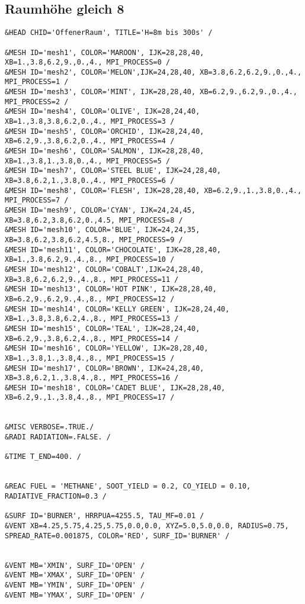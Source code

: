 \subsection*{Raumhöhe gleich 8}
\begin{lstlisting}[emptylines=0,basicstyle=\tiny]
&HEAD CHID='OffenerRaum', TITLE='H=8m bis 300s' /

&MESH ID='mesh1', COLOR='MAROON', IJK=28,28,40, XB=1.,3.8,6.2,9.,0.,4., MPI_PROCESS=0 /
&MESH ID='mesh2', COLOR='MELON',IJK=24,28,40, XB=3.8,6.2,6.2,9.,0.,4., MPI_PROCESS=1 /
&MESH ID='mesh3', COLOR='MINT', IJK=28,28,40, XB=6.2,9.,6.2,9.,0.,4., MPI_PROCESS=2 /
&MESH ID='mesh4', COLOR='OLIVE', IJK=28,24,40, XB=1.,3.8,3.8,6.2,0.,4., MPI_PROCESS=3 /
&MESH ID='mesh5', COLOR='ORCHID', IJK=28,24,40, XB=6.2,9.,3.8,6.2,0.,4., MPI_PROCESS=4 /
&MESH ID='mesh6', COLOR='SALMON', IJK=28,28,40, XB=1.,3.8,1.,3.8,0.,4., MPI_PROCESS=5 /
&MESH ID='mesh7', COLOR='STEEL BLUE', IJK=24,28,40, XB=3.8,6.2,1.,3.8,0.,4., MPI_PROCESS=6 /
&MESH ID='mesh8', COLOR='FLESH', IJK=28,28,40, XB=6.2,9.,1.,3.8,0.,4., MPI_PROCESS=7 /
&MESH ID='mesh9', COLOR='CYAN', IJK=24,24,45, XB=3.8,6.2,3.8,6.2,0.,4.5, MPI_PROCESS=8 /
&MESH ID='mesh10', COLOR='BLUE', IJK=24,24,35, XB=3.8,6.2,3.8,6.2,4.5,8., MPI_PROCESS=9 /
&MESH ID='mesh11', COLOR='CHOCOLATE', IJK=28,28,40, XB=1.,3.8,6.2,9.,4.,8., MPI_PROCESS=10 /
&MESH ID='mesh12', COLOR='COBALT',IJK=24,28,40, XB=3.8,6.2,6.2,9.,4.,8., MPI_PROCESS=11 /
&MESH ID='mesh13', COLOR='HOT PINK', IJK=28,28,40, XB=6.2,9.,6.2,9.,4.,8., MPI_PROCESS=12 /
&MESH ID='mesh14', COLOR='KELLY GREEN', IJK=28,24,40, XB=1.,3.8,3.8,6.2,4.,8., MPI_PROCESS=13 /
&MESH ID='mesh15', COLOR='TEAL', IJK=28,24,40, XB=6.2,9.,3.8,6.2,4.,8., MPI_PROCESS=14 /
&MESH ID='mesh16', COLOR='YELLOW', IJK=28,28,40, XB=1.,3.8,1.,3.8,4.,8., MPI_PROCESS=15 /
&MESH ID='mesh17', COLOR='BROWN', IJK=24,28,40, XB=3.8,6.2,1.,3.8,4.,8., MPI_PROCESS=16 /
&MESH ID='mesh18', COLOR='CADET BLUE', IJK=28,28,40, XB=6.2,9.,1.,3.8,4.,8., MPI_PROCESS=17 /


&MISC VERBOSE=.TRUE./
&RADI RADIATION=.FALSE. /

&TIME T_END=400. /


&REAC FUEL = 'METHANE', SOOT_YIELD = 0.2, CO_YIELD = 0.10, RADIATIVE_FRACTION=0.3 /

&SURF ID='BURNER', HRRPUA=4255.5, TAU_MF=0.01 /
&VENT XB=4.25,5.75,4.25,5.75,0.0,0.0, XYZ=5.0,5.0,0.0, RADIUS=0.75, SPREAD_RATE=0.001875, COLOR='RED', SURF_ID='BURNER' /


&VENT MB='XMIN', SURF_ID='OPEN' /  
&VENT MB='XMAX', SURF_ID='OPEN' /  
&VENT MB='YMIN', SURF_ID='OPEN' /  
&VENT MB='YMAX', SURF_ID='OPEN' / 


\end{lstlisting}
